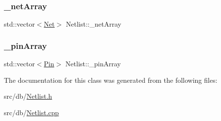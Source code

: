 \mbox{\label{classNetlist_a88ad89f8acc15d2971b0689adaad8704}} 
\subsubsection{\texorpdfstring{\+\_\+net\+Array}{\_netArray}}
{\footnotesize\ttfamily std\+::vector$<$\hyperlink{classNet}{Net}$>$ Netlist\+::\+\_\+net\+Array\hspace{0.3cm}{\ttfamily [private]}}

\mbox{\label{classNetlist_a918185a2ba92067c416408dfc9d8fab2}} 
\subsubsection{\texorpdfstring{\+\_\+pin\+Array}{\_pinArray}}
{\footnotesize\ttfamily std\+::vector$<$\hyperlink{classPin}{Pin}$>$ Netlist\+::\+\_\+pin\+Array\hspace{0.3cm}{\ttfamily [private]}}



The documentation for this class was generated from the following files\+:\begin{DoxyCompactItemize}
\item 
src/db/\hyperlink{Netlist_8h}{Netlist.\+h}\item 
src/db/\hyperlink{Netlist_8cpp}{Netlist.\+cpp}\end{DoxyCompactItemize}
